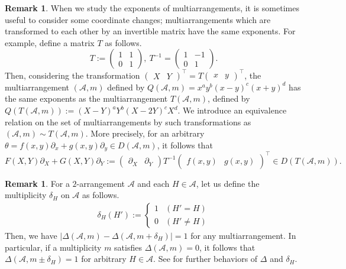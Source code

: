 \documentclass[12pt]{amsart}
\theoremstyle{definition}
\newtheorem{remark}[definition]{Remark}
\newcommand{\AAA}{\mathcal{A}}
\newcommand{\cevxx}[2]{\begin{pmatrix}#1&#2\end{pmatrix}}
\begin{document}
\begin{remark}\label{remark:transformation}
When we study the exponents of multiarrangements, 
it is sometimes useful to consider some coordinate changes; %
multiarrangements which are transformed to each other 
by an invertible matrix have the same exponents. 
For example, define a matrix $T$ as follows. 
\[
T:=
\left(
\begin{array}{cc}
 1 & 1 \\
 0 & 1
\end{array}
\right),\
T^{-1}=
\left(
\begin{array}{cc}
 1 &-1 \\
 0 & 1
\end{array}
\right).
\]
Then, considering the transformation $\cevxx{X}{Y}^\top=T\cevxx{x}{y}^\top$, 
the multiarrangement $(\AAA,m)$ defined by $Q(\AAA,m)=x^ay^b(x-y)^c(x+y)^d$ 
has the same exponents as 
the multiarrangement $T(\AAA,m)$, defined by $Q(T(\AAA,m)):=(X-Y)^aY^b(X-2Y)^cX^d$. 
We introduce an equivalence relation on the set of multiarrangements 
by such transformations as $(\AAA,m)\sim T(\AAA,m)$. 
More precisely, 
for an arbitrary $\theta=f(x,y)\partial_x + g(x,y)\partial_y\in D(\AAA,m)$, 
it follows that 
$$F(X,Y)\partial_X+G(X,Y)\partial_Y:=\cevxx{\partial_X}{\partial_Y}T^{-1}\cevxx{f(x,y)}{g(x,y)}^\top \in D(T(\AAA,m)).$$
\end{remark}

\begin{remark}\label{remark:delta_H}
    For a $2$-arrangement $\AAA$ and each $H\in\AAA$, 
    let us define the multiplicity $\delta_H$ on $\AAA$ %
    as follows. %
\begin{align*}
\delta_H(H'):=
\left\{
\begin{array}{ll}
1 & (H'=H)\\
0 & (H'\neq H)
\end{array}
\right.
\end{align*}
    Then, we have $|\Delta(\AAA,m)-\Delta(\AAA,m+\delta_H)|=1$ 
    for any multiarrangement. %
    In particular, if a multiplicity $m$ satisfies $\Delta(\AAA,m)=0$, 
    it follows that $\Delta(\AAA,m\pm\delta_H)=1$ for arbitrary $H\in\AAA$.     
    See \cite{Abe-Numata} %
    for further behaviors of $\Delta$ and $\delta_H$. 
\end{remark}

\end{document}
